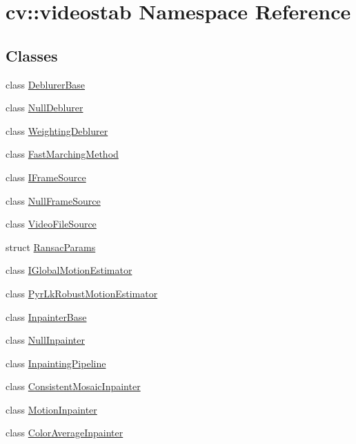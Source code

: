 \hypertarget{namespacecv_1_1videostab}{\section{cv\-:\-:videostab Namespace Reference}
\label{namespacecv_1_1videostab}
}
\subsection*{Classes}
\begin{DoxyCompactItemize}
\item 
class \hyperlink{classcv_1_1videostab_1_1DeblurerBase}{Deblurer\-Base}
\item 
class \hyperlink{classcv_1_1videostab_1_1NullDeblurer}{Null\-Deblurer}
\item 
class \hyperlink{classcv_1_1videostab_1_1WeightingDeblurer}{Weighting\-Deblurer}
\item 
class \hyperlink{classcv_1_1videostab_1_1FastMarchingMethod}{Fast\-Marching\-Method}
\item 
class \hyperlink{classcv_1_1videostab_1_1IFrameSource}{I\-Frame\-Source}
\item 
class \hyperlink{classcv_1_1videostab_1_1NullFrameSource}{Null\-Frame\-Source}
\item 
class \hyperlink{classcv_1_1videostab_1_1VideoFileSource}{Video\-File\-Source}
\item 
struct \hyperlink{structcv_1_1videostab_1_1RansacParams}{Ransac\-Params}
\item 
class \hyperlink{classcv_1_1videostab_1_1IGlobalMotionEstimator}{I\-Global\-Motion\-Estimator}
\item 
class \hyperlink{classcv_1_1videostab_1_1PyrLkRobustMotionEstimator}{Pyr\-Lk\-Robust\-Motion\-Estimator}
\item 
class \hyperlink{classcv_1_1videostab_1_1InpainterBase}{Inpainter\-Base}
\item 
class \hyperlink{classcv_1_1videostab_1_1NullInpainter}{Null\-Inpainter}
\item 
class \hyperlink{classcv_1_1videostab_1_1InpaintingPipeline}{Inpainting\-Pipeline}
\item 
class \hyperlink{classcv_1_1videostab_1_1ConsistentMosaicInpainter}{Consistent\-Mosaic\-Inpainter}
\item 
class \hyperlink{classcv_1_1videostab_1_1MotionInpainter}{Motion\-Inpainter}
\item 
class \hyperlink{classcv_1_1videostab_1_1ColorAverageInpainter}{Color\-Average\-Inpainter}

\end{DoxyCompactItemize}
